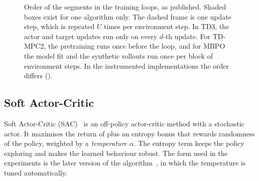 \begin{figure}[tbp]
  \caption{Order of the segments in the training loops, as published.
    Shaded boxes exist for one algorithm only.
    The dashed frame is one update step, which is repeated $U$ times per environment step.
    In TD3, the actor and target updates run only on every $d$-th update.
    For TD-MPC2, the pretraining runs once before the loop, and for MBPO the model fit and the synthetic rollouts run once per block of environment steps.
    In the instrumented implementations the order differs ().}
  \label{fig:alg-loops}
\end{figure}

\subsection{Soft Actor-Critic}\label{sec:algo-sac}

Soft Actor-Critic (SAC)~\cite{haarnoja2018sac} is an off-policy actor-critic method with a stochastic actor.
It maximises the return of  plus an entropy bonus that rewards randomness of the policy, weighted by a \emph{temperature} $\alpha$.
The entropy term keeps the policy exploring and makes the learned behaviour robust.
The form used in the experiments is the later version of the algorithm~\cite{haarnoja2018sacapps}, in which the temperature is tuned automatically.

